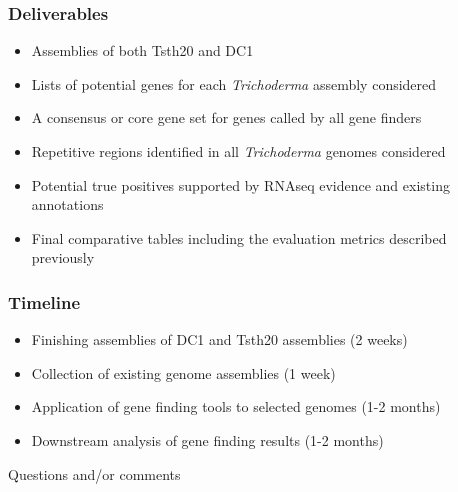 \documentclass{beamer}
\begin{document}
\begin{frame}
  \frametitle{Deliverables}
  \begin{itemize}
  \item Assemblies of both Tsth20 and DC1
  \item Lists of potential genes for each \textit{Trichoderma}
    assembly considered
  \item A consensus or core gene set for genes called by all gene
    finders
  \item Repetitive regions identified in all \textit{Trichoderma}
    genomes considered
  \item Potential true positives supported by RNAseq evidence and
    existing annotations
  \item Final comparative tables including the evaluation metrics
    described previously
  \end{itemize}
\end{frame}

\begin{frame}
  \frametitle{Timeline}
  \begin{itemize}
  \item Finishing assemblies of DC1 and Tsth20 assemblies (2 weeks)
  \item Collection of existing genome assemblies (1 week)
  \item Application of gene finding tools to selected genomes (1-2
    months)
  \item Downstream analysis of gene finding results (1-2 months)
  \end{itemize}
\end{frame}

\begin{frame}
  \begin{center}
    Questions and/or comments
  \end{center}
\end{frame}
\end{document}
